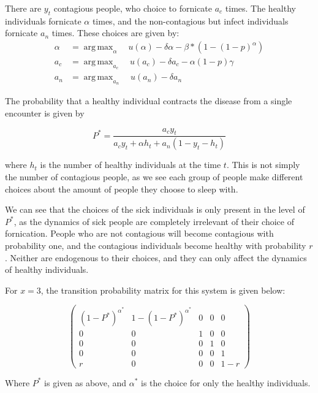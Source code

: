 \documentclass[12pt]{paper}
\DeclareMathOperator*{\argmax}{arg\,max}
\begin{document}
There are $y_t$ contagious people, who choice to fornicate $a_c$
times. The healthy individuals fornicate $\alpha$ times, and the
non-contagious but infect individuals fornicate $a_n$ times.  These
choices are given by:
\begin{align*}
  \alpha &= \argmax_{\alpha} \quad u(\alpha) - \delta\alpha - \beta*( 1 - (1-p)^{\alpha})\\
  a_c &= \argmax_{a_c} \quad u( a_c) - \delta a_c - \alpha ( 1 - p)\gamma\\
  a_n &= \argmax_{a_n} \quad u( a_n) - \delta a_n                   
\end{align*}

The probability that a healthy individual contracts the disease from a
single encounter is given by


\begin{equation*}
  P^{*} = \frac{a_c y_t}{a_c y_t + \alpha h_t + a_n (1 - y_t - h_t)}
\end{equation*}

where $h_t$ is the number of healthy individuals at the time $t$. This
is not simply the number of contagious people, as we see each group of
people make different choices about the amount of people they choose
to sleep with.

We can see that the choices of the sick individuals is only present in
the level of $P^{*}$, as the dynamics of sick people are completely
irrelevant of their choice of fornication. People who are not
contagious will become contagious with probability one, and the
contagious individuals become healthy with probability $r$. Neither
are endogenous to their choices, and they can only affect the dynamics
of healthy individuals.

For $x = 3$, the transition probability matrix for this system is
given below:

\begin{equation*}
\begin{pmatrix}
  (1-P^{*})^{\alpha^{*}} & 1 - (1-P^{*})^{\alpha^{*}} & 0 &0 &0\\
  0 & 0 & 1 & 0 & 0\\
  0 & 0 & 0 & 1 & 0\\
  0 & 0 & 0 & 0 & 1\\
  r & 0 & 0 & 0 & 1 -r
\end{pmatrix}
\end{equation*}

Where $P^{*}$ is given as above, and $\alpha^{*}$ is the choice for only
the healthy individuals. 
\end{document}
